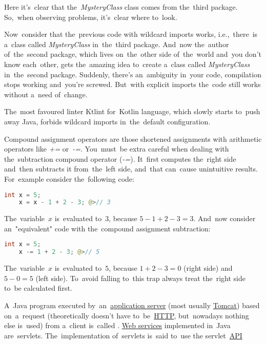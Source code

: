 \noindent Here it's~clear that the~\textit{MysteryClass} class comes from the~third package.
So,~when observing problems, it's~clear where to~look.

Now~consider that the~previous code with wildcard imports works, i.e.,~there~is a~class called \textit{MysteryClass} in~the~third package.
And~now the~author of~the~second package, which lives on~the~other side of~the~world and~you don't know each~other, gets the~amazing idea to~create a~class called \textit{MysteryClass} in~the~second package.
Suddenly, there's an~ambiguity in~your code, compilation stops working and~you're screwed.
But~with explicit imports the~code still works without a~need of~change.

\note The~most favoured linter Ktlint for~Kotlin language, which slowly starts to~push away Java, forbids wildcard imports in~the~default configuration.

Compound assignment operators are those shortened assignments with arithmetic operators like \mbox{\textquotesingle\textit{+=}\textquotesingle} or~\mbox{\textquotesingle\textit{-=}\textquotesingle}.
You~must~be extra careful when dealing with the~subtraction compound operator (\mbox{\textquotesingle\textit{-=}\textquotesingle}).
It~first computes the~right side and~then subtracts it from~the~left side, and~that can~cause unintuitive results.
For~example consider the~following code:
\begin{lstlisting}[language=Java, frame=no]
    int x = 5;
    x = x - 1 + 2 - 3; @>// 3
\end{lstlisting}

\noindent The~variable~$x$ is~evaluated to~$3$, because $5-1+2-3=3$.
And~now consider an~"equivalent" code with the~compound assignment subtraction:
\begin{lstlisting}[language=Java, frame=no]
    int x = 5;
    x -= 1 + 2 - 3; @>// 5
\end{lstlisting}

\noindent The~variable~$x$ is~evaluated to~$5$, because $1+2-3=0$ (right side) and~$5-0=5$ (left side).
To~avoid falling to~this trap always treat the~right side to~be calculated first.

\label{serialization}

\label{servlet}
A~Java program executed by~an~\hyperref[applicationserver]{application server} (most usually \hyperref[tomcat]{Tomcat}) based on~a~request (theoretically doesn't have to~be~\hyperref[http]{HTTP}, but~nowadays nothing else is~used) from a~client is~called .
\hyperref[webserviceapplication]{Web services} implemented in~Java are~servlets.
The~implementation of~servlets is~said to~use the servlet~\hyperref[api]{API}

